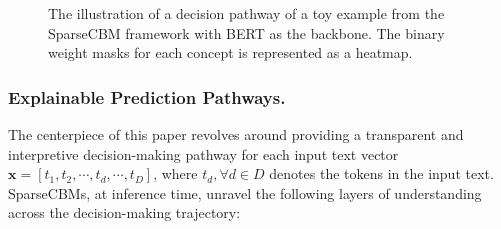 \documentclass[letterpaper]{article} %
\begin{document}
\begin{figure}[b]
  \centering
  \caption{{The illustration of a decision pathway of a toy example from the SparseCBM framework with BERT as the backbone. The binary weight masks for each concept is represented as a heatmap.}}\label{fig:example}
\end{figure}

\subsubsection{Explainable Prediction Pathways.}
The centerpiece of this paper revolves around providing a transparent and interpretive decision-making pathway for each input text vector $\bm{x} = [t_1,t_2,\cdots, t_d,\cdots,t_D]$, where $t_d, \forall d \in D$ denotes the tokens in the input text. SparseCBMs, at inference time, unravel the following layers of understanding across the decision-making trajectory: 
\end{document}
